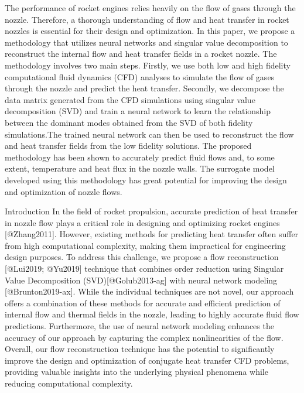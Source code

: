 \begin{frame}
The performance of rocket engines relies heavily on the flow of gases
through the nozzle. Therefore, a thorough understanding of flow and heat
transfer in rocket nozzles is essential for their design and
optimization. In this paper, we propose a methodology that utilizes
neural networks and singular value decomposition to reconstruct the
internal flow and heat transfer fields in a rocket nozzle. The
methodology involves two main steps. Firstly, we use both low and high
fidelity computational fluid dynamics (CFD) analyses to simulate the
flow of gases through the nozzle and predict the heat transfer.
Secondly, we decompose the data matrix generated from the CFD
simulations using singular value decomposition (SVD) and train a neural
network to learn the relationship between the dominant modes obtained
from the SVD of both fidelity simulations.The trained neural network can
then be used to reconstruct the flow and heat transfer fields from the
low fidelity solutions. The proposed methodology has been shown to
accurately predict fluid flows and, to some extent, temperature and heat
flux in the nozzle walls. The surrogate model developed using this
methodology has great potential for improving the design and
optimization of nozzle flows.
\end{frame}

\begin{frame}{Introduction}
\protect\hypertarget{introduction}{}
In the field of rocket propulsion, accurate prediction of heat transfer
in nozzle flow plays a critical role in designing and optimizing rocket
engines {[}@Zhang2011{]}. However, existing methods for predicting heat
transfer often suffer from high computational complexity, making them
impractical for engineering design purposes. To address this challenge,
we propose a flow reconstruction {[}@Lui2019; @Yu2019{]} technique that
combines order reduction using Singular Value Decomposition
(SVD){[}@Golub2013-ag{]} with neural network modeling
{[}@Brunton2019-ax{]}. While the individual techniques are not novel,
our approach offers a combination of these methods for accurate and
efficient prediction of internal flow and thermal fields in the nozzle,
leading to highly accurate fluid flow predictions. Furthermore, the use
of neural network modeling enhances the accuracy of our approach by
capturing the complex nonlinearities of the flow. Overall, our flow
reconstruction technique has the potential to significantly improve the
design and optimization of conjugate heat transfer CFD problems,
providing valuable insights into the underlying physical phenomena while
reducing computational complexity.
\end{frame}


